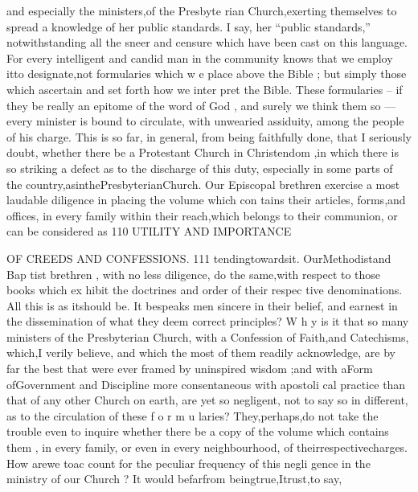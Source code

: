 \documentclass[
]{book}
\begin{document}
and especially the ministers,of the Presbyte
rian Church,exerting themselves to spread a knowledge of her public standards. I say,
her ``public standards,'' notwithstanding all the sneer and censure which have been cast
on this language. For every intelligent and
candid man in the community knows that we
employ itto designate,not formularies which
w e place above the Bible ; but simply those which ascertain and set forth how we inter
pret the Bible. These formularies -- if they
be really an epitome of the word of God , and
surely we think them so --- every minister is bound to circulate, with unwearied assiduity, among the people of his charge. This is so
far, in general, from being faithfully done,
that I seriously doubt, whether there be a
Protestant Church in Christendom ,in which
there is so striking a defect as to the discharge
of this duty, especially in some parts of the
country,asinthePresbyterianChurch. Our
Episcopal brethren exercise a most laudable
diligence in placing the volume which con tains their articles, forms,and offices, in every
family within their reach,which belongs to their communion, or can be considered as
110 UTILITY AND IMPORTANCE

OF CREEDS AND CONFESSIONS. 111
tendingtowardsit. OurMethodistand Bap tist brethren , with no less diligence, do the same,with respect to those books which ex hibit the doctrines and order of their respec tive denominations. All this is as itshould be. It bespeaks men sincere in their belief,
and earnest in the dissemination of what they
deem correct principles? W h y is it that so
many ministers of the Presbyterian Church,
with a Confession of Faith,and Catechisms, which,I verily believe, and which the most
of them readily acknowledge, are by far the best that were ever framed by uninspired wisdom ;and with aForm ofGovernment and Discipline more consentaneous with apostoli
cal practice than that of any other Church on
earth, are yet so negligent, not to say so in different, as to the circulation of these f o r m u
laries? They,perhaps,do not take the trouble
even to inquire whether there be a copy of the volume which contains them , in every
family, or even in every neighbourhood, of theirrespectivecharges. How arewe toac count for the peculiar frequency of this negli
gence in the ministry of our Church ? It would befarfrom beingtrue,Itrust,to say,
\end{document}
